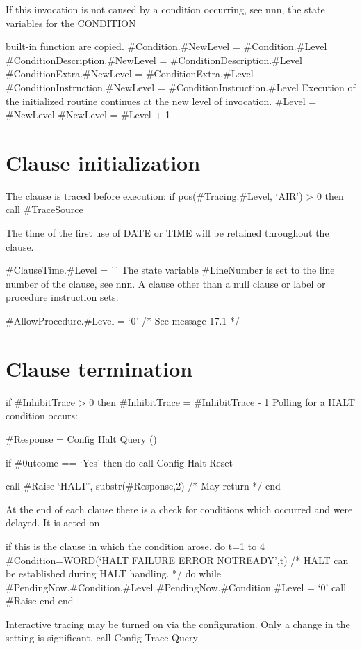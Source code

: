 If this invocation is not caused by a condition occurring, see nnn, the
state variables for the CONDITION

built-in function are copied. \#Condition.\#NewLevel =
\#Condition.\#Level \#ConditionDescription.\#NewLevel =
\#ConditionDescription.\#Level \#ConditionExtra.\#NewLevel =
\#ConditionExtra.\#Level \#ConditionInstruction.\#NewLevel =
\#ConditionInstruction.\#Level Execution of the initialized routine
continues at the new level of invocation. \#Level = \#NewLevel
\#NewLevel = \#Level + 1

\section{Clause initialization}\label{clause-initialization}

The clause is traced before execution: if pos(\#Tracing.\#Level, `AIR')
\textgreater{} 0 then call \#TraceSource

The time of the first use of DATE or TIME will be retained throughout
the clause.

\#ClauseTime.\#Level = '\,' The state variable \#LineNumber is set to
the line number of the clause, see nnn. A clause other than a null
clause or label or procedure instruction sets:

\#AllowProcedure.\#Level = `0' /* See message 17.1 */

\section{Clause termination}\label{clause-termination}

if \#InhibitTrace \textgreater{} 0 then \#InhibitTrace = \#InhibitTrace
- 1 Polling for a HALT condition occurs:

\#Response = Config Halt Query ()

if \#0utcome == `Yes' then do call Config Halt Reset

call \#Raise `HALT', substr(\#Response,2) /* May return */ end

At the end of each clause there is a check for conditions which occurred
and were delayed. It is acted on

if this is the clause in which the condition arose. do t=1 to 4
\#Condition=WORD(`HALT FAILURE ERROR NOTREADY',t) /* HALT can be
established during HALT handling. */ do while
\#PendingNow.\#Condition.\#Level \#PendingNow.\#Condition.\#Level = `0'
call \#Raise end end

Interactive tracing may be turned on via the configuration. Only a
change in the setting is significant. call Config Trace Query

